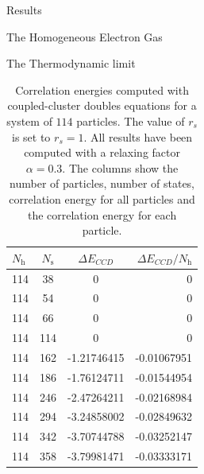 \documentclass[twoside,english]{uiofysmaster}
\begin{document}
\begin{chapter}{Results}
\begin{section}{The Homogeneous Electron Gas}
\begin{subsection}{The Thermodynamic limit}
			\begin{table}[H]
				\begin{center}
					\begin{tabular}[center]{l  c  c r}
						$N_{\text{h}}$ & $N_{\text{s}}$ & $\Delta E_{CCD}$ & $\Delta E_{CCD}/N_{\text{h}}$ \\
						\hline
						114 &  38 & 0 &0\\
						114 &  54 & 0 &0\\
						114 &  66 & 0 &0\\
						114 & 114 & 0 &0\\
						114 & 162 & -1.21746415 & -0.01067951 \\
						114 & 186 & -1.76124711 & -0.01544954 \\
						114 & 246 & -2.47264211 & -0.02168984 \\
						114 & 294 & -3.24858002 & -0.02849632 \\
						114 & 342 & -3.70744788 & -0.03252147 \\
						114 & 358 & -3.79981471 & -0.03333171
					\end{tabular}
				\end{center}
				\caption{Correlation energies computed with coupled-cluster doubles equations for a system of $114$ particles. The value of $r_s$ is set to $r_s=1$. All results have been computed with a relaxing factor $\alpha=0.3$. The columns show the number of particles, number of states, correlation energy for all particles and the correlation energy for each particle.}
				\label{table:ThermodynamicLimit5}
			\end{table}
		\end{subsection}
	\end{section}


\end{chapter}
\end{document}
